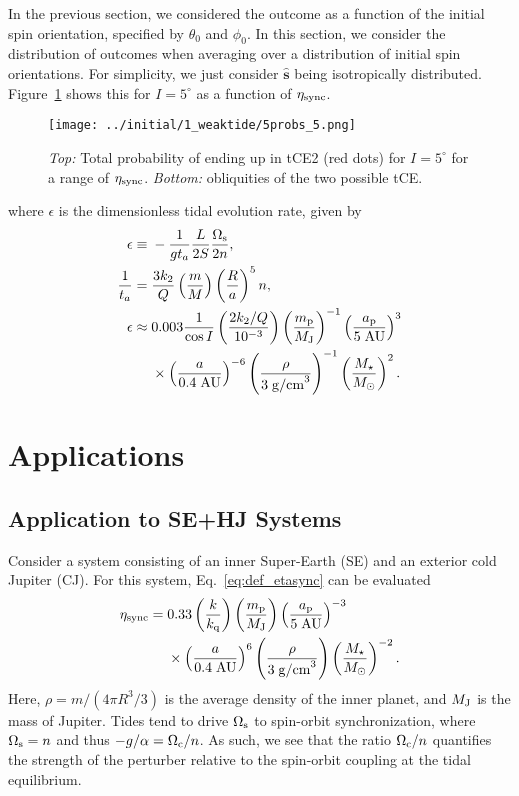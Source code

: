 \documentclass[
        fleqn,
        usenatbib,
    ]{mnras}
\newcommand*{\p}[1]{\left(#1\right)}
\newcommand*{\uv}[1]{\hat{\mathbf{#1}}}
\begin{document}
In the previous section, we considered the outcome as a function of the initial
spin orientation, specified by $\theta_0$ and $\phi_0$. In this section, we
consider the distribution of outcomes when averaging over a distribution of
initial spin orientations. For simplicity, we just consider $\uv{s}$ being
isotropically distributed. Figure~\ref{fig:probs} shows this for $I
= 5^\circ$ as a function of $\eta_{\rm sync}$.
\begin{figure}
    \centering
    \texttt{[image: ../initial/1\_weaktide/5probs\_5.png]}
    \caption{\emph{Top:} Total probability of ending up in tCE2 (red dots) for
    $I = 5^\circ$ for a range of $\eta_{\rm sync}$. \emph{Bottom:}
    obliquities of the two possible tCE.}\label{fig:probs}
\end{figure}
where $\epsilon$ is the dimensionless tidal evolution rate, given by
\begin{align}
    \epsilon \equiv{}& -\frac{1}{gt_a}\frac{L}{2S} \frac{\Omega_{\rm s}}{2n},\\
    \frac{1}{t_a} ={}& \frac{3k_2}{Q}\p{\frac{m}{M}}\p{\frac{R}{a}}^5 n,\\
    \epsilon \approx{}& 0.003\frac{1}{\cos I}\p{\frac{2k_2/Q}{10^{-3}}}
            \p{\frac{m_{\rm p}}{M_{\rm J}}}^{-1}
            \p{\frac{a_{\rm p}}{5 \;\mathrm{AU}}}^{3}\nonumber\\
        &\times \p{\frac{a}{0.4\;\mathrm{AU}}}^{-6}
            \p{\frac{\rho}{3 \; \mathrm{g/cm}^3}}^{-1}
            \p{\frac{M_\star}{M_{\odot}}}^{2}.
\end{align}


\section{Applications}

\subsection{Application to SE+HJ Systems}\label{ss:disc_sehj}

Consider a system consisting of an inner Super-Earth (SE) and an exterior cold
Jupiter (CJ). For this system, Eq.~\eqref{eq:def_etasync} can be evaluated
\begin{align}
    \eta_{\rm sync} ={}& 0.33 \p{\frac{k}{k_{\rm q}}}
            \p{\frac{m_{\rm p}}{M_{\rm J}}}
            \p{\frac{a_{\rm p}}{5 \;\mathrm{AU}}}^{-3}\nonumber\\
        &\times \p{\frac{a}{0.4\;\mathrm{AU}}}^{6}
            \p{\frac{\rho}{3 \; \mathrm{g/cm}^3}}
            \p{\frac{M_\star}{M_{\odot}}}^{-2}.\label{eq:sehj_etasync}
\end{align}
Here, $\rho = m / \p{4\pi R^3/3}$ is the average density of the inner planet,
and $M_{\rm J}$ is the mass of Jupiter. Tides tend to drive $\Omega_{\rm s}$ to
spin-orbit synchronization, where $\Omega_{\rm s} = n$ and thus $-g / \alpha =
\Omega_{\rm c} / n$. As such, we see that the ratio $\Omega_{\rm c} / n$
quantifies the strength of the perturber relative to the spin-orbit coupling at
the tidal equilibrium.
\end{document}
